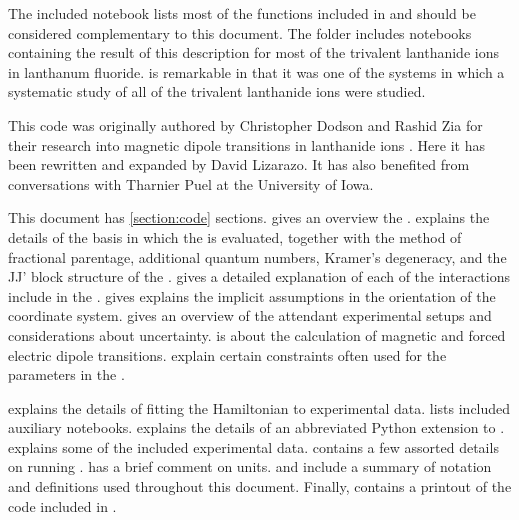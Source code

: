 \documentclass[11pt, twoside,openright]{article}
\begin{document}
The included \mathematica notebook  lists most of the functions included in \qlanth and should be considered complementary to this document. The  folder includes notebooks containing the result of this description for most of the trivalent lanthanide ions in lanthanum fluoride. \LaFthree is remarkable in that it was one of the systems in which a systematic study \cite{carnall_systematic_1989} of all of the trivalent lanthanide ions were studied.

This code was originally authored by Christopher Dodson and Rashid Zia for their research into magnetic dipole transitions in lanthanide ions \cite{dodson_magnetic_2012}. Here it has been rewritten and expanded by David Lizarazo. It has also benefited from conversations with Tharnier Puel at the University of Iowa.

This document has \ref{section:code} sections.  gives an overview the \hamilton.  explains the details of the basis in which the \hamilton is evaluated, together with the method of fractional parentage, additional quantum numbers, Kramer's degeneracy, and the JJ' block structure of the \hamilton.  gives a detailed explanation of each of the interactions include in the \hamilton.  gives explains the implicit assumptions in the orientation of the coordinate system.  gives an overview of the attendant experimental setups and considerations about uncertainty.  is about the calculation of magnetic and forced electric dipole transitions.   explain certain constraints often used for the parameters in the \hamilton.
 
 explains the details of fitting the Hamiltonian to experimental data. lists included auxiliary \mathematica notebooks.  explains the details of an abbreviated Python extension to \qlanth.  explains some of the included experimental data.   contains a few assorted details on running \qlanth.  has a brief comment on units.  and  include a summary of notation and definitions used throughout this document. Finally,  contains a printout of the code included in \qlanth.
\end{document}
